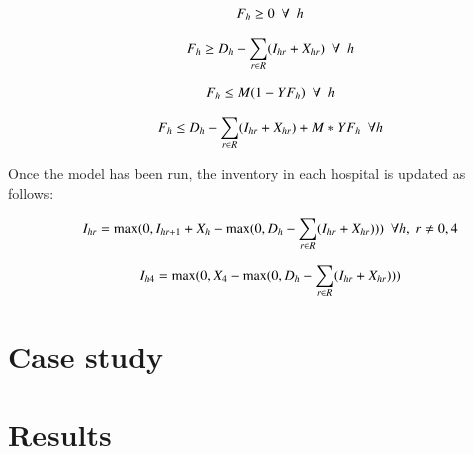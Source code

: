 \documentclass{elsarticle}
\begin{document}
	  	\begin{equation}
	\begin{array}{ll@{}ll}
	& \displaystyle F_{h} \geq 0 \ \ \forall \ \ h\\
	\end{array}
	\label{eq:Eq33}	
	\end{equation}


  	\begin{equation}
	\begin{array}{ll@{}ll}
	& \displaystyle F_{h} \geq D_{h} - \sum\limits_{r \in R}(I_{hr} + X_{hr}) \ \ \forall \ \ h\\
	\end{array}
	\label{eq:Eq33}	
	\end{equation}

	
		\begin{equation}
	\begin{array}{ll@{}ll}
	& \displaystyle F_{h} \leq M(1-YF_{h}) \ \ \forall \ \ h\\
	\end{array}
	\label{eq:Eq33}	
	\end{equation}

	\begin{equation}
	\begin{array}{ll@{}ll}
	& \displaystyle F_{h} \leq D_{h} - \sum\limits_{r \in R}(I_{hr} + X_{hr}) +M*YF_{h} \ \ \forall h\\
	\end{array}
	\label{eq:Eq32}
	\end{equation}	
	
Once the model has been run, the inventory in each hospital is updated as follows:

	\begin{equation}
	\begin{array}{ll@{}ll}
	& \displaystyle I_{hr} = \max(0, I_{hr+1} + X_{h} - \max(0,D_{h}- \sum\limits_{r \in R}(I_{hr} + X_{hr}))) \ \ \forall h, \ r \neq 0 , 4 \\
	\end{array}
	\label{eq:Eq32}
	\end{equation}	

	
	\begin{equation}
	\begin{array}{ll@{}ll}
	& \displaystyle I_{h4} = \max(0, X_{4} - \max(0,D_{h}- \sum\limits_{r \in R}(I_{hr} + X_{hr})))\\
	\end{array}
	\label{eq:Eq32}
	\end{equation}	

\section{Case study}

\section{Results}


\end{document}
